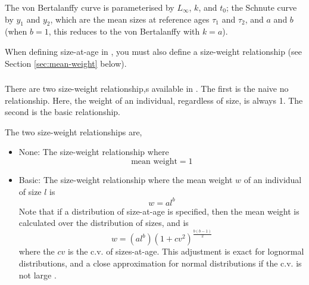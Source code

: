 The von Bertalanffy curve is parameterised by $L_\infty$, $k$, and $t_0$; the Schnute curve \citep{836} by $y_1$ and $y_2$, which are the mean sizes at reference ages $\tau_1$ and $\tau_2$, and $a$ and $b$ (when $b=1$, this reduces to the von Bertalanffy with $k=a$). 

When defining size-at-age in \CAS, you must also define a size-weight relationship (see Section \ref{sec:mean-weight} below).

\subsubsection*{}

\subsubsection*{}

\subsubsection*{\label{sec:mean-weight}}

There are two size-weight relationship,s available in \CAS. The first is the naive no relationship. Here, the weight of an individual, regardless of size, is always 1. The second is the basic relationship. 

The two size-weight relationships are,

\begin{itemize}
  \item{None:} The size-weight relationship where  
  \begin{equation}
    \text{mean weight}=1
  \end{equation}
  \item{Basic:} The size-weight relationship where the mean weight $w$ of an individual of size $l$ is
  \begin{equation}
    w=a l^b
  \end{equation}
	Note that if a distribution of size-at-age is specified, then the mean weight is calculated over the distribution of sizes, and is
  \begin{equation}
	  w=(al^b)(1+cv^2)^{\frac{b(b-1)}{2}}
  \end{equation}
	where the $cv$ is the c.v. of sizes-at-age. This adjustment is exact for lognormal distributions, and a close approximation for normal distributions if the c.v. is not large \citep{1388}.
\end{itemize}

